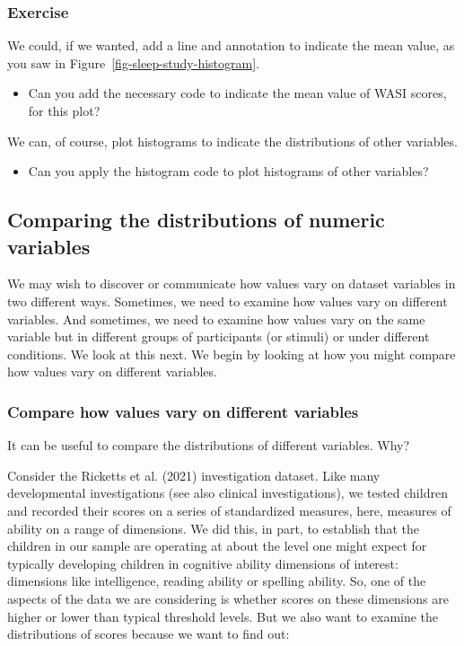 \documentclass[
  letterpaper,
  DIV=11,
  numbers=noendperiod]{scrreprt}
\providecommand{\tightlist}{%
  \setlength{\itemsep}{0pt}\setlength{\parskip}{0pt}}\usepackage{longtable,booktabs,array}
\begin{document}
\hypertarget{exercise-1}{%
\subsubsection{Exercise}\label{exercise-1}}

We could, if we wanted, add a line and annotation to indicate the mean
value, as you saw in Figure~\ref{fig-sleep-study-histogram}.

\begin{itemize}
\tightlist
\item
  Can you add the necessary code to indicate the mean value of WASI
  scores, for this plot?
\end{itemize}

We can, of course, plot histograms to indicate the distributions of
other variables.

\begin{itemize}
\tightlist
\item
  Can you apply the histogram code to plot histograms of other
  variables?
\end{itemize}

\hypertarget{sec-compare-distributions}{%
\subsection{Comparing the distributions of numeric
variables}\label{sec-compare-distributions}}

We may wish to discover or communicate how values vary on dataset
variables in two different ways. Sometimes, we need to examine how
values vary on different variables. And sometimes, we need to examine
how values vary on the same variable but in different groups of
participants (or stimuli) or under different conditions. We look at this
next. We begin by looking at how you might compare how values vary on
different variables.

\hypertarget{sec-compare-distributions-variables}{%
\subsubsection{Compare how values vary on different
variables}\label{sec-compare-distributions-variables}}

It can be useful to compare the distributions of different variables.
Why?

Consider the Ricketts et al. (2021) investigation dataset. Like many
developmental investigations (see also clinical investigations), we
tested children and recorded their scores on a series of standardized
measures, here, measures of ability on a range of dimensions. We did
this, in part, to establish that the children in our sample are
operating at about the level one might expect for typically developing
children in cognitive ability dimensions of interest: dimensions like
intelligence, reading ability or spelling ability. So, one of the
aspects of the data we are considering is whether scores on these
dimensions are higher or lower than typical threshold levels. But we
also want to examine the distributions of scores because we want to find
out:
\end{document}
